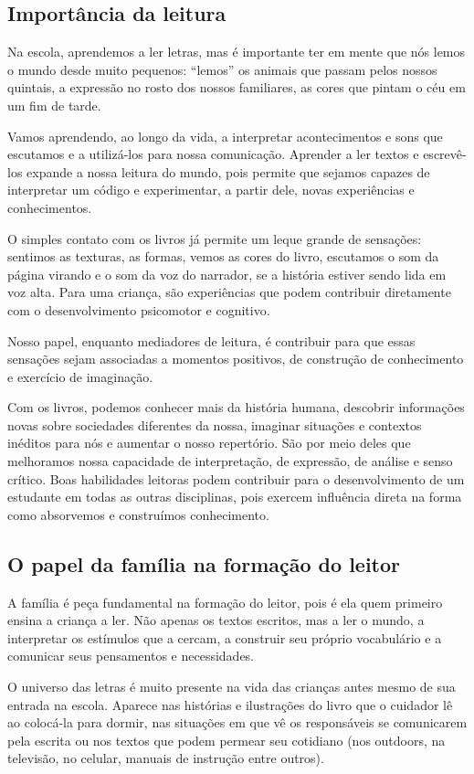 \documentclass[11pt]{extarticle}
\begin{document}
\subsection{Importância da leitura}
Na escola, aprendemos a ler letras, mas é importante ter em mente que nós 
lemos o mundo desde muito pequenos: “lemos” os animais que passam pelos nossos 
quintais, a expressão no rosto dos nossos familiares, as cores que pintam o céu 
em um fim de tarde. 

Vamos aprendendo, ao longo da vida, a interpretar acontecimentos 
e sons que escutamos e a utilizá-los para nossa comunicação. Aprender a ler textos e 
escrevê-los expande a nossa leitura do mundo, pois permite que sejamos capazes de 
interpretar um código e experimentar, a partir dele, novas experiências e conhecimentos. 

O simples contato com os livros já permite um leque grande de sensações: 
sentimos as texturas, as formas, vemos as cores do livro, escutamos o som da página 
virando e o som da voz do narrador, se a história estiver sendo lida em voz alta. Para uma 
criança, são experiências que podem contribuir diretamente com o desenvolvimento psicomotor 
e cognitivo. 

Nosso papel, enquanto mediadores de leitura, é contribuir para que essas 
sensações sejam associadas a momentos positivos, de construção de 
conhecimento e exercício de imaginação. 

Com os livros, podemos conhecer mais da história humana, descobrir informações 
novas sobre sociedades diferentes da nossa, imaginar situações e contextos inéditos 
para nós e aumentar o nosso repertório. São por meio deles que melhoramos nossa 
capacidade de interpretação, de expressão, de análise e senso crítico. Boas habilidades 
leitoras podem contribuir para o desenvolvimento de um estudante em todas as outras 
disciplinas, pois exercem influência direta na forma como absorvemos e 
construímos conhecimento.


\subsection{O papel da família na formação do leitor}
A família é peça fundamental na formação do leitor, pois é ela quem primeiro 
ensina a criança a ler. Não apenas os textos escritos, mas a ler o mundo, a 
interpretar os estímulos que a cercam, a construir seu próprio vocabulário e a 
comunicar seus pensamentos e necessidades.

O universo das letras é muito presente na vida das crianças antes mesmo de sua 
entrada na escola. Aparece nas histórias e ilustrações do livro que o cuidador 
lê ao colocá-la para dormir, nas situações em que vê os responsáveis se comunicarem 
pela escrita ou nos textos que podem permear seu cotidiano (nos outdoors, na 
televisão, no celular, manuais de instrução entre outros). 
\end{document}
